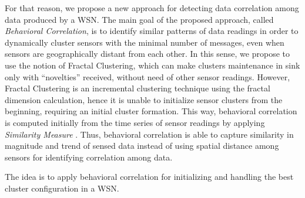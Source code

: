 \documentclass{acm_proc_article-sp}
\begin{document}
For that reason, we propose a new approach for detecting data correlation among
data produced by a WSN. The main goal of the proposed approach, called  {\it
Behavioral Correlation}, is to identify similar patterns of data readings in
order to dynamically cluster sensors with the minimal number of messages, even
when sensors are geographically distant from each other. In this sense, we
propose to use the notion of Fractal Clustering, which can make clusters
maintenance in sink only with ``novelties'' received, without need of other
sensor readings.
However, Fractal Clustering \cite{Barbara2000} is an incremental clustering
technique using the fractal dimension calculation, hence it is unable to
initialize sensor clusters from the beginning, requiring an initial cluster
formation. This way, behavioral correlation is computed initially from the time
series of sensor readings by applying {\it Similarity Measure} \cite{Liu2007}.
Thus, behavioral correlation is able to capture similarity in magnitude and
trend of sensed data instead of using spatial distance among sensors for
identifying correlation among data.
\vspace*{-.3cm}

The idea is to apply behavioral correlation for initializing and handling
the best cluster configuration in a WSN.
\vspace*{-.3cm}

\end{document}
